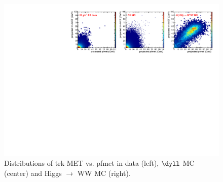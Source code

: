 \begin{figure}[hbt]
\begin{center}
\includegraphics[width=1\linewidth]{figures/met_scatter.pdf} 
\caption{\label{fig:met_scatter}\protect Distributions of trk-MET vs. pfmet in data (left), 
$\dyll$ MC (center) and Higgs $\rightarrow$ WW MC (right).}
\end{center}
\end{figure}

